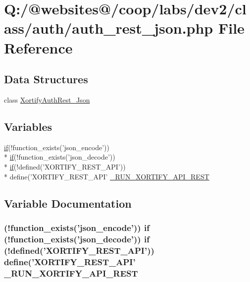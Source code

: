 \hypertarget{auth__rest__json_8php}{\section{Q\-:/@websites@/coop/labs/dev2/class/auth/auth\-\_\-rest\-\_\-json.php File Reference}
\label{auth__rest__json_8php}
}
\subsection*{Data Structures}
\begin{DoxyCompactItemize}
\item 
class \hyperlink{class_xortify_auth_rest___json}{Xortify\-Auth\-Rest\-\_\-\-Json}
\end{DoxyCompactItemize}
\subsection*{Variables}
\begin{DoxyCompactItemize}
\item 
\hyperlink{index_8php_ae2ccdf355624402b65fc2226f2a661cd}{if}(!function\-\_\-exists('json\-\_\-encode')) \\*
\hyperlink{index_8php_ae2ccdf355624402b65fc2226f2a661cd}{if}(!function\-\_\-exists('json\-\_\-decode')) \\*
\hyperlink{index_8php_ae2ccdf355624402b65fc2226f2a661cd}{if}(!defined('X\-O\-R\-T\-I\-F\-Y\-\_\-\-R\-E\-S\-T\-\_\-\-A\-P\-I')) \\*
define('X\-O\-R\-T\-I\-F\-Y\-\_\-\-R\-E\-S\-T\-\_\-\-A\-P\-I' \hyperlink{auth__rest__json_8php_afdc545ca06d322c86eccc65ea3f38868}{\-\_\-\-R\-U\-N\-\_\-\-X\-O\-R\-T\-I\-F\-Y\-\_\-\-A\-P\-I\-\_\-\-R\-E\-S\-T}
\end{DoxyCompactItemize}


\subsection{Variable Documentation}
\hypertarget{auth__rest__json_8php_afdc545ca06d322c86eccc65ea3f38868}{
\subsubsection[{\-\_\-\-R\-U\-N\-\_\-\-X\-O\-R\-T\-I\-F\-Y\-\_\-\-A\-P\-I\-\_\-\-R\-E\-S\-T}]{ (!function\-\_\-exists('json\-\_\-encode')) {\bf if} (!function\-\_\-exists('json\-\_\-decode')) {\bf if} (!defined('X\-O\-R\-T\-I\-F\-Y\-\_\-\-R\-E\-S\-T\-\_\-\-A\-P\-I')) define('X\-O\-R\-T\-I\-F\-Y\-\_\-\-R\-E\-S\-T\-\_\-\-A\-P\-I' \-\_\-\-R\-U\-N\-\_\-\-X\-O\-R\-T\-I\-F\-Y\-\_\-\-A\-P\-I\-\_\-\-R\-E\-S\-T}}\label{auth__rest__json_8php_afdc545ca06d322c86eccc65ea3f38868}
